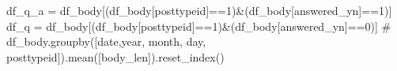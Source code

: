 \documentclass[
  letterpaper,
  DIV=11,
  numbers=noendperiod]{scrartcl}
\newenvironment{Shaded}{\begin{snugshade}}{\end{snugshade}}
\newcommand{\CommentTok}[1]{\textcolor[rgb]{0.37,0.37,0.37}{#1}}
\newcommand{\DecValTok}[1]{\textcolor[rgb]{0.68,0.00,0.00}{#1}}
\newcommand{\NormalTok}[1]{\textcolor[rgb]{0.00,0.23,0.31}{#1}}
\newcommand{\OperatorTok}[1]{\textcolor[rgb]{0.37,0.37,0.37}{#1}}
\newcommand{\StringTok}[1]{\textcolor[rgb]{0.13,0.47,0.30}{#1}}
\begin{document}
\begin{Shaded}
\begin{Highlighting}[]
\NormalTok{df\_q\_a }\OperatorTok{=}\NormalTok{ df\_body[(df\_body[}\StringTok{\textquotesingle{}posttypeid\textquotesingle{}}\NormalTok{]}\OperatorTok{==}\StringTok{\textquotesingle{}1\textquotesingle{}}\NormalTok{)}\OperatorTok{\&}\NormalTok{(df\_body[}\StringTok{\textquotesingle{}answered\_yn\textquotesingle{}}\NormalTok{]}\OperatorTok{==}\DecValTok{1}\NormalTok{)]}
\NormalTok{df\_q }\OperatorTok{=}\NormalTok{ df\_body[(df\_body[}\StringTok{\textquotesingle{}posttypeid\textquotesingle{}}\NormalTok{]}\OperatorTok{==}\StringTok{\textquotesingle{}1\textquotesingle{}}\NormalTok{)}\OperatorTok{\&}\NormalTok{(df\_body[}\StringTok{\textquotesingle{}answered\_yn\textquotesingle{}}\NormalTok{]}\OperatorTok{==}\DecValTok{0}\NormalTok{)]}
\CommentTok{\# df\_body.groupby([\textquotesingle{}date\textquotesingle{},\textquotesingle{}year\textquotesingle{}, \textquotesingle{}month\textquotesingle{}, \textquotesingle{}day\textquotesingle{}, \textquotesingle{}posttypeid\textquotesingle{}]).mean([\textquotesingle{}body\_len\textquotesingle{}]).reset\_index()}
\end{Highlighting}
\end{Shaded}
\end{document}
